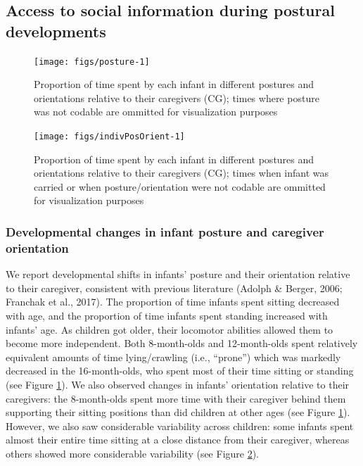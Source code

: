 \documentclass[english,man]{apa6}
\begin{document}
\subsection{Access to social information during postural
developments}\label{access-to-social-information-during-postural-developments}

\begin{figure}[H]
\texttt{[image: figs/posture-1]} \caption{Proportion of time spent by each infant in different postures and orientations relative to their caregivers (CG); times where posture was not codable are ommitted for visualization purposes}\label{fig:posture}
\end{figure}

\begin{figure}[H]
\texttt{[image: figs/indivPosOrient-1]} \caption{Proportion of time spent by each infant in different postures and orientations relative to their caregivers (CG); times when infant was carried or when posture/orientation were not codable are ommitted for visualization purposes}\label{fig:indivPosOrient}
\end{figure}

\subsubsection{Developmental changes in infant posture and caregiver
orientation}\label{developmental-changes-in-infant-posture-and-caregiver-orientation}

We report developmental shifts in infants' posture and their orientation
relative to their caregiver, consistent with previous literature (Adolph
\& Berger, 2006; Franchak et al., 2017). The proportion of time infants
spent sitting decreased with age, and the proportion of time infants
spent standing increased with infants' age. As children got older, their
locomotor abilities allowed them to become more independent. Both
8-month-olds and 12-month-olds spent relatively equivalent amounts of
time lying/crawling (i.e., \enquote{prone}) which was markedly decreased
in the 16-month-olds, who spent most of their time sitting or standing
(see Figure \ref{fig:posture}). We also observed changes in infants'
orientation relative to their caregivers: the 8-month-olds spent more
time with their caregiver behind them supporting their sitting positions
than did children at other ages (see Figure \ref{fig:posture}). However,
we also saw considerable variability across children: some infants spent
almost their entire time sitting at a close distance from their
caregiver, whereas others showed more considerable variability (see
Figure \ref{fig:indivPosOrient}).
\end{document}
